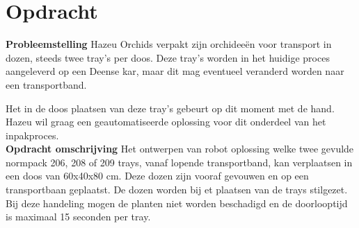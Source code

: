 \section{Opdracht}
	\textbf{Probleemstelling}
	Hazeu Orchids verpakt zijn orchideeën voor transport in dozen, steeds twee tray's per doos. Deze tray's worden in het huidige proces aangeleverd op een Deense kar, maar dit mag eventueel veranderd worden naar een transportband.\newline
	
	Het in de doos plaatsen van deze tray's gebeurt op dit moment met de hand. Hazeu wil graag een geautomatiseerde oplossing voor dit onderdeel van het inpakproces.\\[0.5cm]
	
	
	
	\textbf{Opdracht omschrijving}
	Het ontwerpen van robot oplossing welke twee gevulde normpack  206, 208 of 209 trays, vanaf lopende transportband, kan verplaatsen in een doos van 60x40x80 cm. Deze dozen zijn vooraf gevouwen en op een transportbaan geplaatst. De dozen worden bij et plaatsen van de trays stilgezet. Bij deze handeling mogen de planten niet worden beschadigd en de doorlooptijd is maximaal 15 seconden per tray.
	
	
\newpage